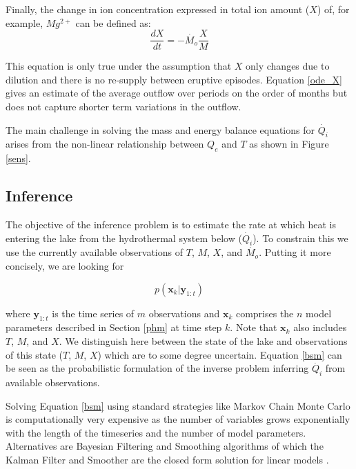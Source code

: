 \documentclass[doublespacing]{bmcart}
\newcommand{\bm}[1]{{\textbf{#1}}}
\begin{document}
Finally, the change in ion concentration expressed in total ion amount ($X$) of,
for example, $Mg^{2+}$ can be defined as:
\begin{equation}\label{ode_X}
	\frac{dX}{dt}=-\dot{M_o}\frac{X}{M}
\end{equation}

This equation is only true under the assumption that $X$ only changes due to
dilution and there is no re-supply between eruptive episodes. Equation
\ref{ode_X} gives an estimate of the average outflow over periods on the order
of months but does not capture shorter term variations in the outflow.

The main challenge in solving the mass and energy balance equations for
$\dot{Q_i}$ arises from the non-linear relationship between $Q_e$ and ${T}$
as shown in Figure \ref{sens}.

\subsection{Inference}\label{inf}

The objective of the inference problem is to estimate the rate at which heat
is entering the lake from the hydrothermal system below ($\dot{Q_i}$).
To constrain this we use the currently available observations of $T$, $M$,
$X$, and $\dot{M_o}$. Putting it more concisely, we are looking for 

\begin{equation}\label{bsm}
    p(\bm{x}_k|\bm{y}_{1:t})
\end{equation}

where $\bm{y}_{1:t}$ is the time series of $m$ observations and $\bm{x}_k$ comprises
the $n$ model parameters described in Section \ref{phm} at time step $k$. Note
that $\bm{x}_k$ also includes $T$, $M$, and $X$. We distinguish here between the
state of the lake and observations of this state ($T$, $M$, $X$) which are to
some degree uncertain. Equation \ref{bsm} can be seen as the probabilistic
formulation of the inverse problem inferring $\dot{Q_i}$ from available
observations.  

Solving Equation \ref{bsm} using standard strategies like Markov Chain Monte
Carlo is computationally very expensive as the number of variables grows
exponentially with the length of the timeseries and the number of model
parameters. Alternatives are Bayesian Filtering and Smoothing algorithms of
which the Kalman Filter and Smoother are the closed form solution for linear
models \cite{Kalman1960, Rauch1965, sarkkaBayesianFilteringSmoothing2013}.
\end{document}
